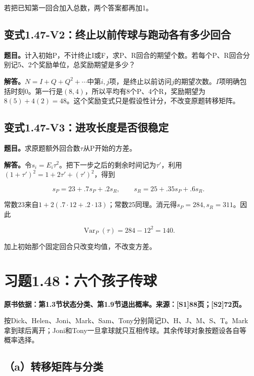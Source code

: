 \documentclass[
  11pt,
  a4paper,
  UTF8,
  fontset=fandol]{ctexart}
\begin{document}
若把已知第一回合加入总数，两个答案都再加1。

\subsection{变式1.47-V2：终止以前传球与跑动各有多少回合}\label{ux53d8ux5f0f1.47-v2ux7ec8ux6b62ux4ee5ux524dux4f20ux7403ux4e0eux8dd1ux52a8ux5404ux6709ux591aux5c11ux56deux5408}

\textbf{题目。}计入初始P，不计终止I或F，求P、R回合的期望个数。若每个P、R回合分别记5、2个奖励单位，总奖励期望是多少？

\textbf{解答。}\(N=I+Q+Q^2+\cdots\)中第\(i,j\)项，是终止以前访问\(j\)的期望次数。\(I\)项明确包括时刻0。第一行是\((8,4)\)，所以平均有8个P、4个R，奖励期望为\(8(5)+4(2)=\boxed{48}\)。这个奖励变式只是假设性计分，不改变原题转移矩阵。

\subsection{变式1.47-V3：进攻长度是否很稳定}\label{ux53d8ux5f0f1.47-v3ux8fdbux653bux957fux5ea6ux662fux5426ux5f88ux7a33ux5b9a}

\textbf{题目。}求原题额外回合数\(\tau\)从P开始的方差。

\textbf{解答。}令\(s_i=E_i\tau^2\)。把下一步之后的剩余时间记为\(\tau'\)，利用\((1+\tau')^2=1+2\tau'+(\tau')^2\)，得到

\[
s_P=23+.7s_P+.2s_R,\qquad
s_R=25+.35s_P+.6s_R.
\]

常数23来自\(1+2(.7\cdot12+.2\cdot13)\)；常数25同理。消元得\(s_P=284,s_R=311\)。因此

\[
\boxed{\operatorname{Var}_P(\tau)=284-12^2=140.}
\]

加上初始那个固定回合只改变均值，不改变方差。

\section{习题1.48：六个孩子传球}\label{ux4e60ux98981.48ux516dux4e2aux5b69ux5b50ux4f20ux7403}

\textbf{原书依据：第1.3节状态分类、第1.9节退出概率。来源：{[}S1{]}88页；{[}S2{]}72页。}

按Dick、Helen、Joni、Mark、Sam、Tony分别简记D、H、J、M、S、T。Mark拿到球后离开；Joni和Tony一旦拿球就只互相传球。其余传球对象按题设各自等概率选择。

\subsection{（a）转移矩阵与分类}\label{aux8f6cux79fbux77e9ux9635ux4e0eux5206ux7c7b}
\end{document}
